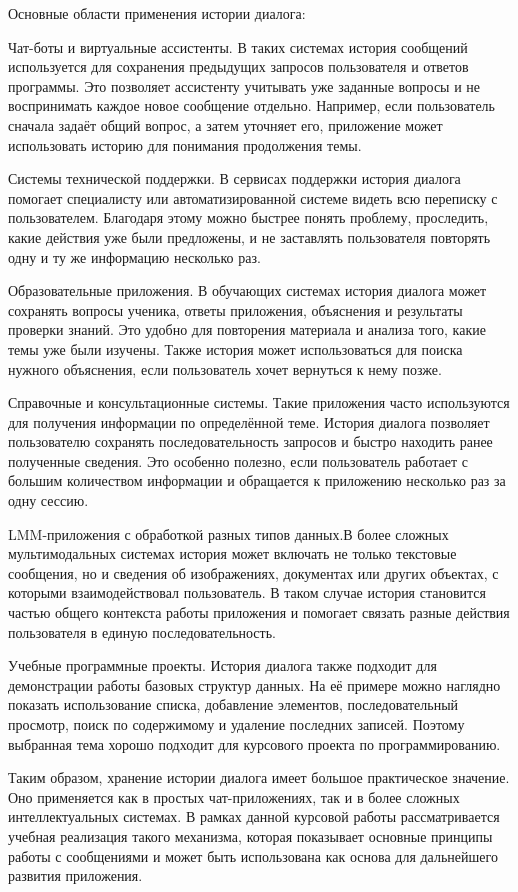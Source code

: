 \documentclass[12pt,a4paper]{article}
\begin{document}
Основные области применения истории диалога:

Чат-боты и виртуальные ассистенты. В таких системах история сообщений используется для сохранения предыдущих запросов пользователя и ответов программы. Это позволяет ассистенту учитывать уже заданные вопросы и не воспринимать каждое новое сообщение отдельно. Например, если пользователь сначала задаёт общий вопрос, а затем уточняет его, приложение может использовать историю для понимания продолжения темы.

Системы технической поддержки. В сервисах поддержки история диалога помогает специалисту или автоматизированной системе видеть всю переписку с пользователем. Благодаря этому можно быстрее понять проблему, проследить, какие действия уже были предложены, и не заставлять пользователя повторять одну и ту же информацию несколько раз.

Образовательные приложения. В обучающих системах история диалога может сохранять вопросы ученика, ответы приложения, объяснения и результаты проверки знаний. Это удобно для повторения материала и анализа того, какие темы уже были изучены. Также история может использоваться для поиска нужного объяснения, если пользователь хочет вернуться к нему позже.

Справочные и консультационные системы. Такие приложения часто используются для получения информации по определённой теме. История диалога позволяет пользователю сохранять последовательность запросов и быстро находить ранее полученные сведения. Это особенно полезно, если пользователь работает с большим количеством информации и обращается к приложению несколько раз за одну сессию.

LMM-приложения с обработкой разных типов данных.В более сложных мультимодальных системах история может включать не только текстовые сообщения, но и сведения об изображениях, документах или других объектах, с которыми взаимодействовал пользователь. В таком случае история становится частью общего контекста работы приложения и помогает связать разные действия пользователя в единую последовательность.

Учебные программные проекты. История диалога также подходит для демонстрации работы базовых структур данных. На её примере можно наглядно показать использование списка, добавление элементов, последовательный просмотр, поиск по содержимому и удаление последних записей. Поэтому выбранная тема хорошо подходит для курсового проекта по программированию.

Таким образом, хранение истории диалога имеет большое практическое значение. Оно применяется как в простых чат-приложениях, так и в более сложных интеллектуальных системах. В рамках данной курсовой работы рассматривается учебная реализация такого механизма, которая показывает основные принципы работы с сообщениями и может быть использована как основа для дальнейшего развития приложения.
\end{document}
